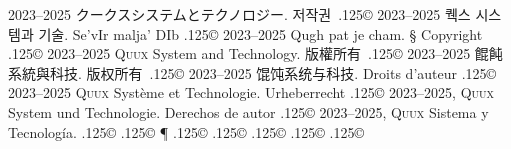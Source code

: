 \documentclass{cookbook}
\begin{document}
{{{	2023--2025 クークスシステムとテクノロジー.
저작권~{\lower.125\baselineskip\hbox{\copyright}}
	2023--2025 퀙스 시스템과 기술.
Se'vIr malja' DIb {\lower.125\baselineskip\hbox{\copyright}} %
	2023--2025 Qugh pat je cham.
\S\texttt{{\gitabbrcommithash}}
Copyright {\lower.125\baselineskip\hbox{\copyright}}
	2023--2025 \textsc{Quux} System and Technology.
版權所有~{\lower.125\baselineskip\hbox{\copyright}}
	2023--2025 餛飩系統與科技.
版权所有~{\lower.125\baselineskip\hbox{\copyright}}
	2023--2025 馄饨系统与科技.
Droits d'auteur {\lower.125\baselineskip\hbox{\copyright}} %
	2023--2025 \textsc{Quux} Système et Technologie.
Urheberrecht {\lower.125\baselineskip\hbox{\copyright}} %
	2023--2025, \textsc{Quux} System und Technologie.
Derechos de autor {\lower.125\baselineskip\hbox{\copyright}} %
	2023--2025, \textsc{Quux} Sistema y Tecnología.
{\lower.125\baselineskip\hbox{\copyright}}
{\lower.125\baselineskip\hbox{\copyright}}
\P\texttt{{\gitabbrcommithash}}
\hspace{.25em plus 1em}%
{\lower.125\baselineskip\hbox{\copyright}}
{\lower.125\baselineskip\hbox{\copyright}}
{\lower.125\baselineskip\hbox{\copyright}}
{\lower.125\baselineskip\hbox{\copyright}}
{\lower.125\baselineskip\hbox{\copyright}}
\vspace{-.5\textheight}%
}}}%
\end{document}
